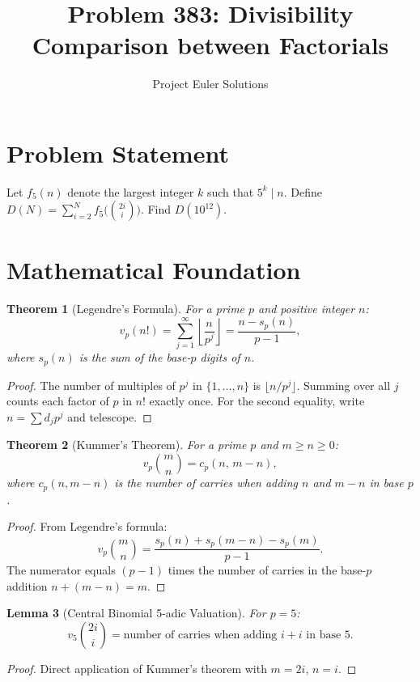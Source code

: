 \documentclass[11pt]{article}
\title{Problem 383: Divisibility Comparison between Factorials}
\author{Project Euler Solutions}
\date{}
\newtheorem{theorem}{Theorem}
\newtheorem{lemma}[theorem]{Lemma}
\begin{document}
\maketitle

\section{Problem Statement}

Let $f_5(n)$ denote the largest integer $k$ such that $5^k \mid n$. Define $D(N) = \sum_{i=2}^{N} f_5\!\bigl(\binom{2i}{i}\bigr)$. Find $D(10^{12})$.

\section{Mathematical Foundation}

\begin{theorem}[Legendre's Formula]
For a prime $p$ and positive integer $n$:
\[
v_p(n!) = \sum_{j=1}^{\infty} \left\lfloor \frac{n}{p^j} \right\rfloor = \frac{n - s_p(n)}{p - 1},
\]
where $s_p(n)$ is the sum of the base-$p$ digits of $n$.
\end{theorem}

\begin{proof}
The number of multiples of $p^j$ in $\{1, \ldots, n\}$ is $\lfloor n/p^j \rfloor$. Summing over all $j$ counts each factor of $p$ in $n!$ exactly once. For the second equality, write $n = \sum d_j p^j$ and telescope.
\end{proof}

\begin{theorem}[Kummer's Theorem]
For a prime $p$ and $m \ge n \ge 0$:
\[
v_p\binom{m}{n} = c_p(n,\, m-n),
\]
where $c_p(n, m-n)$ is the number of carries when adding $n$ and $m - n$ in base $p$.
\end{theorem}

\begin{proof}
From Legendre's formula:
\[
v_p\binom{m}{n} = \frac{s_p(n) + s_p(m-n) - s_p(m)}{p-1}.
\]
The numerator equals $(p-1)$ times the number of carries in the base-$p$ addition $n + (m-n) = m$.
\end{proof}

\begin{lemma}[Central Binomial 5-adic Valuation]
For $p = 5$:
\[
v_5\binom{2i}{i} = \text{number of carries when adding } i + i \text{ in base } 5.
\]
\end{lemma}

\begin{proof}
Direct application of Kummer's theorem with $m = 2i$, $n = i$.
\end{proof}
\end{document}
